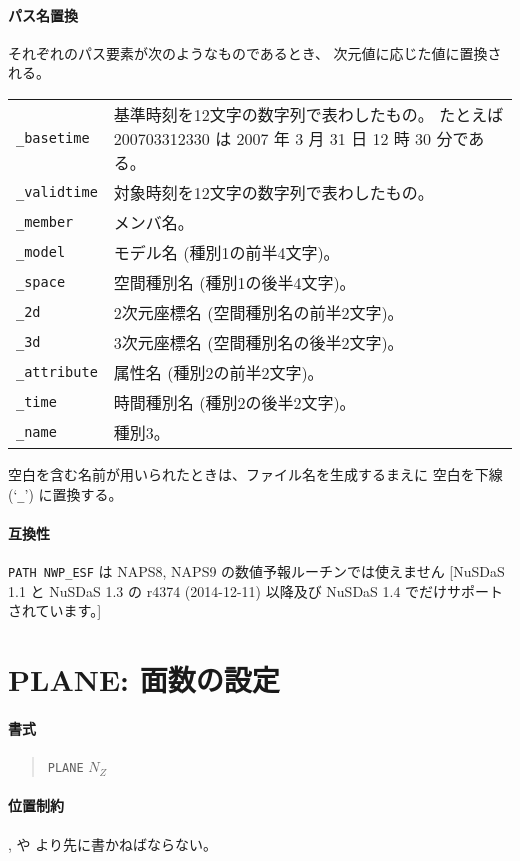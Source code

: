 \paragraph{パス名置換}
それぞれのパス要素が次のようなものであるとき、
次元値に応じた値に置換される。

\begin{tabular}{lp{}}
{\tt \_basetime}
	& 基準時刻を12文字の数字列で表わしたもの。
	たとえば 200703312330 は 2007 年 3 月 31 日 12 時 30 分である。 \\
{\tt \_validtime} & 対象時刻を12文字の数字列で表わしたもの。 \\
{\tt \_member} & メンバ名。 \\
{\tt \_model} & モデル名 (種別1の前半4文字)。 \\
{\tt \_space} & 空間種別名 (種別1の後半4文字)。 \\
{\tt \_2d} & 2次元座標名 (空間種別名の前半2文字)。 \\
{\tt \_3d} & 3次元座標名 (空間種別名の後半2文字)。 \\
{\tt \_attribute} & 属性名 (種別2の前半2文字)。 \\
{\tt \_time} & 時間種別名 (種別2の後半2文字)。 \\
{\tt \_name} & 種別3。 \\
\end{tabular}

空白を含む名前が用いられたときは、ファイル名を生成するまえに
空白を下線 (`{\tt \_}') に置換する。

\paragraph{互換性}
{\tt PATH NWP\_ESF} 
は NAPS8, NAPS9 の数値予報ルーチンでは使えません
[NuSDaS 1.1 と NuSDaS 1.3 の r4374 (2014-12-11)
以降及び NuSDaS 1.4 でだけサポートされています。]

\section{PLANE: 面数の設定}
\label{sec:def:PLANE}
\paragraph{書式}
\begin{quote}
{\tt PLANE} $N_Z$
\end{quote}
\paragraph{位置制約}
,
 や
 より先に書かねばならない。
